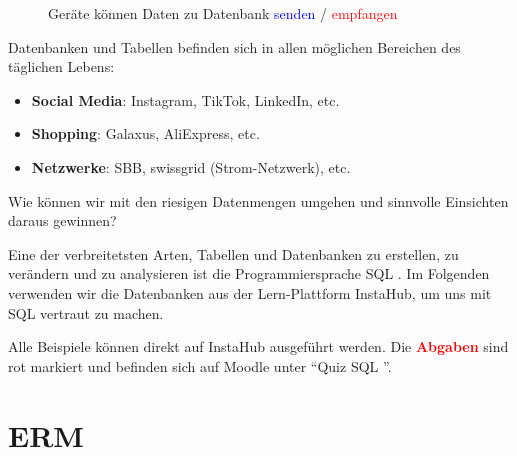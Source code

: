\begin{figure}[H]
\centering
{}
\caption{Geräte können Daten zu Datenbank	 \textcolor{blue}{senden} / \textcolor{red}{empfangen}}
\label{fig:db-schema}
\end{figure}

Datenbanken und Tabellen befinden sich in allen möglichen Bereichen des täglichen Lebens:
\begin{itemize}
	\item \textbf{Social Media}: Instagram, TikTok, LinkedIn, etc.
	\item \textbf{Shopping}: Galaxus, AliExpress, etc.
	\item \textbf{Netzwerke}: SBB, swissgrid (Strom-Netzwerk), etc.
\end{itemize}

Wie können wir mit den riesigen Datenmengen umgehen und sinnvolle Einsichten daraus gewinnen?

Eine der verbreitetsten Arten, Tabellen und Datenbanken zu erstellen, zu verändern und zu analysieren ist die Programmiersprache \gls{SQL} . Im Folgenden verwenden wir die Datenbanken aus der Lern-Plattform InstaHub, um uns mit \gls{SQL}  vertraut zu machen.

Alle Beispiele können direkt auf InstaHub ausgeführt werden. Die \textcolor{red}{\textbf{Abgaben}} sind rot markiert und befinden sich auf Moodle unter ``Quiz \gls{SQL} ''.

\section{\acrshort{ERM}}


